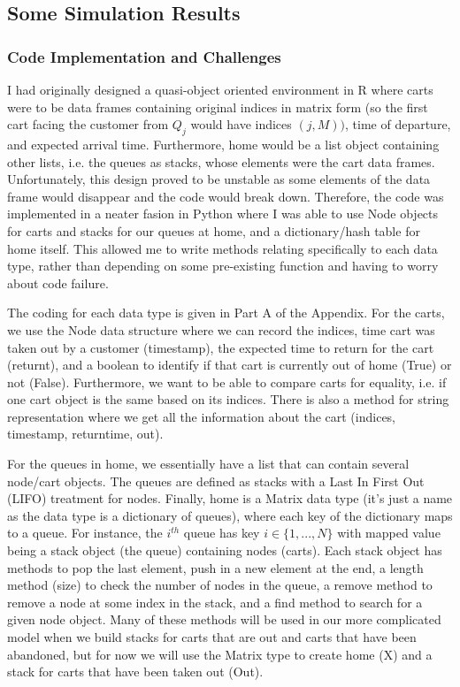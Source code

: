 \documentclass[english]{article}
\begin{document}
\subsection*{Some Simulation Results}
\subsubsection*{Code Implementation and Challenges}
I had originally designed a quasi-object oriented environment in R where carts were to be data frames containing original indices in matrix form (so the first cart facing the customer from $Q_j$ would have indices $(j,M))$, time of departure, and expected arrival time. Furthermore, home would be a list object containing other lists, i.e. the queues as stacks, whose elements were the cart data frames. Unfortunately, this design proved to be unstable as some elements of the data frame would disappear and the code would break down. Therefore, the code was implemented in a neater fasion in Python where I was able to use Node objects for carts and stacks for our queues at home, and a dictionary/hash table for home itself. This allowed me to write methods relating specifically to each data type, rather than depending on some pre-existing function and having to worry about code failure.

The coding for each data type is given in Part A of the Appendix. For the carts, we use the Node data structure where we can record the indices, time cart was taken out by a customer (timestamp), the expected time to return for the cart (returnt), and a boolean to identify if that cart is currently out of home (True) or not (False). Furthermore, we want to be able to compare carts for equality, i.e. if one cart object is the same based on its indices. There is also a method for string representation where we get all the information about the cart (indices, timestamp, returntime, out).

For the queues in home, we essentially have a list that can contain several node/cart objects. The queues are defined as stacks with a Last In First Out (LIFO) treatment for nodes. Finally, home is a Matrix data type (it's just a name as the data type is a dictionary of queues), where each key of the dictionary maps to a queue. For instance, the $i^{th}$ queue has key $i \in \{ 1,...,N\}$ with mapped value being a stack object (the queue) containing nodes (carts). Each stack object has methods to pop the last element, push in a new element at the end, a length method (size) to check the number of nodes in the queue, a remove method to remove a node at some index in the stack, and a find method to search for a given node object. Many of these methods will be used in our more complicated model when we build stacks for carts that are out and carts that have been abandoned, but for now we will use the Matrix type to create home (X) and a stack for carts that have been taken out (Out).
\end{document}

